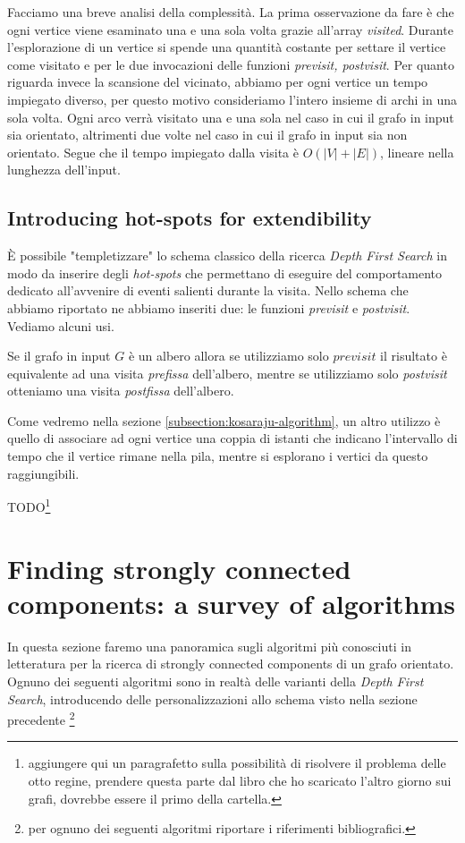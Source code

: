 Facciamo una breve analisi della complessit\`a. La prima osservazione
da fare \`e che ogni vertice viene esaminato una e una sola volta
grazie all'array \emph{visited}. Durante l'esplorazione di un vertice
si spende una quantit\`a costante per settare il vertice come visitato
e per le due invocazioni delle funzioni \emph{previsit,
  postvisit}. Per quanto riguarda invece la scansione del vicinato,
abbiamo per ogni vertice un tempo impiegato diverso, per questo motivo
consideriamo l'intero insieme di archi in una sola volta. Ogni arco
verr\`a visitato una e una sola nel caso in cui il grafo in input sia
orientato, altrimenti due volte nel caso in cui il grafo in input sia
non orientato. Segue che il tempo impiegato dalla visita \`e $O(|V| +
|E|)$, lineare nella lunghezza dell'input.

\subsection{Introducing hot-spots for extendibility}
\`E possibile "templetizzare" lo schema classico della ricerca
\emph{Depth First Search} in modo da inserire degli \emph{hot-spots}
che permettano di eseguire del comportamento dedicato all'avvenire di
eventi salienti durante la visita. Nello schema che abbiamo riportato
ne abbiamo inseriti due: le funzioni \emph{previsit} e
\emph{postvisit}. Vediamo alcuni usi.

Se il grafo in input $G$ \`e un albero allora se utilizziamo solo
$previsit$ il risultato \`e equivalente ad una visita \emph{prefissa}
dell'albero, mentre se utilizziamo solo \emph{postvisit} otteniamo una
visita \emph{postfissa} dell'albero.

Come vedremo nella sezione \ref{subsection:kosaraju-algorithm}, un
altro utilizzo \`e quello di associare ad ogni vertice una coppia di
istanti che indicano l'intervallo di tempo che il vertice rimane nella
pila, mentre si esplorano i vertici da questo raggiungibili.

TODO\footnote{aggiungere qui un paragrafetto sulla possibilit\`a di
  risolvere il problema delle otto regine, prendere questa parte dal
  libro che ho scaricato l'altro giorno sui grafi, dovrebbe essere il
  primo della cartella.}

\section{Finding strongly connected components: a survey of
  algorithms}

In questa sezione faremo una panoramica sugli algoritmi pi\`u
conosciuti in letteratura per la ricerca di strongly connected
components di un grafo orientato. Ognuno dei seguenti algoritmi sono
in realt\`a delle varianti della \emph{Depth First Search},
introducendo delle personalizzazioni allo schema visto nella sezione
precedente \footnote{per ognuno dei seguenti algoritmi riportare i
  riferimenti bibliografici.}

